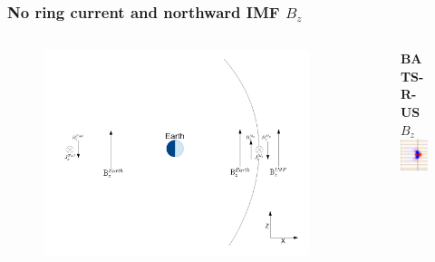 \begin{frame}
	\frametitle{No ring current and northward IMF $B_z$}
	\begin{columns}
	\begin{column}{.6\textwidth}
	\begin{figure}
		\includegraphics[scale=.23]{images/NimfNoRC.pdf}
	\end{figure}
	\end{column}
	\begin{column}{.4\textwidth}
	\begin{figure}
		\textbf{BATS-R-US $B_z$}\\
		\includegraphics[scale=.45]{images/NBzNoRCM.png}
	\end{figure}
	\end{column}
	\end{columns}
\end{frame}

